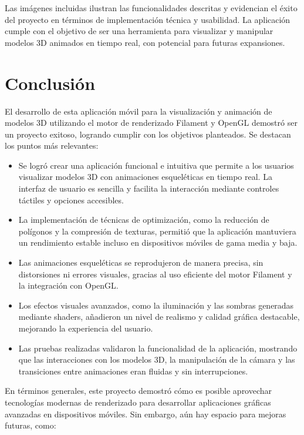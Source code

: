 \documentclass[conference]{IEEEtran}
\begin{document}
Las imágenes incluidas ilustran las funcionalidades descritas y evidencian el éxito del proyecto en términos de implementación técnica y usabilidad. La aplicación cumple con el objetivo de ser una herramienta para visualizar y manipular modelos 3D animados en tiempo real, con potencial para futuras expansiones.

\section{Conclusión}  

El desarrollo de esta aplicación móvil para la visualización y animación de modelos 3D utilizando el motor de renderizado Filament y OpenGL demostró ser un proyecto exitoso, logrando cumplir con los objetivos planteados. Se destacan los puntos más relevantes: \cite{mobileRendering}

\begin{itemize}
    \item Se logró crear una aplicación funcional e intuitiva que permite a los usuarios visualizar modelos 3D con animaciones esqueléticas en tiempo real. La interfaz de usuario es sencilla y facilita la interacción mediante controles táctiles y opciones accesibles.
    \item La implementación de técnicas de optimización, como la reducción de polígonos y la compresión de texturas, permitió que la aplicación mantuviera un rendimiento estable incluso en dispositivos móviles de gama media y baja.
    \item Las animaciones esqueléticas se reprodujeron de manera precisa, sin distorsiones ni errores visuales, gracias al uso eficiente del motor Filament y la integración con OpenGL.
    \item Los efectos visuales avanzados, como la iluminación y las sombras generadas mediante shaders, añadieron un nivel de realismo y calidad gráfica destacable, mejorando la experiencia del usuario.
    \item Las pruebas realizadas validaron la funcionalidad de la aplicación, mostrando que las interacciones con los modelos 3D, la manipulación de la cámara y las transiciones entre animaciones eran fluidas y sin interrupciones.
\end{itemize}

En términos generales, este proyecto demostró cómo es posible aprovechar tecnologías modernas de renderizado para desarrollar aplicaciones gráficas avanzadas en dispositivos móviles. Sin embargo, aún hay espacio para mejoras futuras, como:
\end{document}
